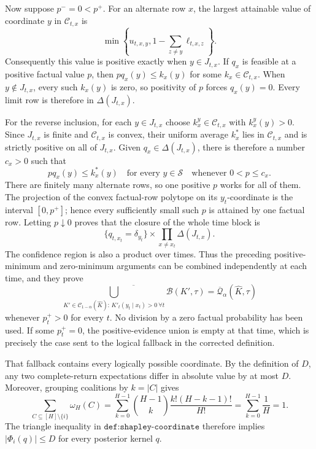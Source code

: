 Now suppose \(p^-=0<p^+\).  For an alternate row \(x\), the largest attainable
value of coordinate \(y\) in \(\mathcal C_{t,x}\) is
\[
 \min\!\left\{u_{t,x,y},1-\sum_{z\ne y}\ell_{t,x,z}\right\}.
\]
Consequently this value is positive exactly when \(y\in J_{t,x}\).  If
\(q_x\) is feasible at a positive factual value \(p\), then
\(p q_x(y)\le k_x(y)\) for some \(k_x\in\mathcal C_{t,x}\).  When
\(y\notin J_{t,x}\), every such \(k_x(y)\) is zero, so positivity of \(p\)
forces \(q_x(y)=0\).  Every limit row is therefore in \(\Delta(J_{t,x})\).

For the reverse inclusion, for each \(y\in J_{t,x}\) choose
\(k_x^y\in\mathcal C_{t,x}\) with \(k_x^y(y)>0\).  Since \(J_{t,x}\) is
finite and \(\mathcal C_{t,x}\) is convex, their uniform average
\(k_x^*\) lies in \(\mathcal C_{t,x}\) and is strictly positive on all of
\(J_{t,x}\).  Given \(q_x\in\Delta(J_{t,x})\), there is therefore a number
\(c_x>0\) such that
\[
 p q_x(y)\le k_x^*(y)
 \quad\text{for every }y\in\mathcal S
 \quad\text{whenever }0<p\le c_x.
\]
There are finitely many alternate rows, so one positive \(p\) works for all
of them.  The projection of the convex factual-row polytope on its
\(y_t\)-coordinate is the interval \([0,p^+]\); hence every sufficiently
small such \(p\) is attained by one factual row.  Letting \(p\downarrow0\)
proves that the closure of the whole time block is
\[
 \{q_{t,x_t}=\delta_{y_t}\}
 \times\prod_{x\ne x_t}\Delta(J_{t,x}).
\]
The confidence region is also a product over times.  Thus the preceding
positive-minimum and zero-minimum arguments can be combined independently at
each time, and they prove
\[
 \overline{\bigcup_{K'\in\mathcal C_{1-\alpha}(\widehat K):\,
             K'_t(y_t\mid x_t)>0\ \forall t}
             \mathcal B(K',\tau)}
 =\overline{\mathcal Q}_{\alpha}(\widehat K,\tau)
\]
whenever \(p_t^+>0\) for every \(t\).  No division by a zero factual
probability has been used.  If some \(p_t^+=0\), the positive-evidence union
is empty at that time, which is precisely the case sent to the logical
fallback in the corrected definition.

That fallback contains every logically possible coordinate.  By the definition
of \(D\), any two complete-return expectations differ in absolute value by at
most \(D\).  Moreover, grouping coalitions by \(k=|C|\) gives
\[
 \sum_{C\subseteq[H]\setminus\{i\}}\omega_H(C)
 =\sum_{k=0}^{H-1}\binom{H-1}{k}
   \frac{k!(H-k-1)!}{H!}
 =\sum_{k=0}^{H-1}\frac1H=1.
\]
The triangle inequality in \(\texttt{def:shapley-coordinate}\) therefore
implies \(|\Phi_i(q)|\le D\) for every posterior kernel \(q\).

